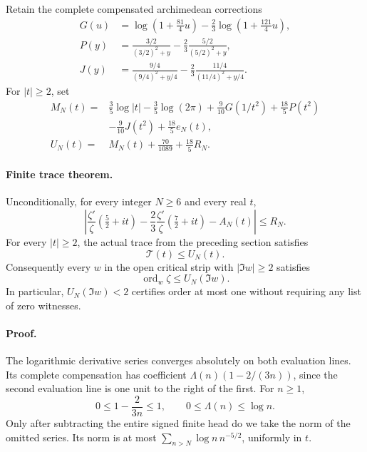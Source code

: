 Retain the complete compensated archimedean corrections
\[
 \begin{aligned}
 G(u)&=\log(1+\tfrac{81}{4}u)
       -\tfrac23\log(1+\tfrac{121}{4}u),\\
 P(y)&=\frac{3/2}{(3/2)^2+y}
       -\frac23\frac{5/2}{(5/2)^2+y},\\
 J(y)&=\frac{9/4}{(9/4)^2+y/4}
       -\frac23\frac{11/4}{(11/4)^2+y/4}.
 \end{aligned}
\]
For \(|t|\ge2\), set
\[
 \begin{aligned}
 M_N(t)={}&\frac35\log|t|-\frac35\log(2\pi)
  +\frac9{10}G(1/t^2)+\frac{18}{5}P(t^2)\\
 &-\frac9{10}J(t^2)+\frac{18}{5}e_N(t),\\
 U_N(t)={}&M_N(t)+\frac{70}{1089}+\frac{18}{5}R_N.
 \end{aligned}
\]

\paragraph{Finite trace theorem.}
Unconditionally, for every integer \(N\ge6\) and every real \(t\),
\begin{equation}
 \left|\frac{\zeta'}{\zeta}(\tfrac52+it)
       -\frac23\frac{\zeta'}{\zeta}(\tfrac72+it)-A_N(t)\right|
 \le R_N.
 \label{eq:finite-euler-error}
\end{equation}
For every \(|t|\ge2\), the actual trace from the preceding section satisfies
\begin{equation}
 \mathcal T(t)\le U_N(t).
 \label{eq:finite-euler-trace}
\end{equation}
Consequently every \(w\) in the open critical strip with \(|\Im w|\ge2\)
satisfies
\[
 \operatorname{ord}_w\zeta\le U_N(\Im w).
\]
In particular, \(U_N(\Im w)<2\) certifies order at most one without requiring
any list of zero witnesses.

\paragraph{Proof.}
The logarithmic derivative series converges absolutely on both evaluation
lines.  Its complete compensation has coefficient
\(\Lambda(n)(1-2/(3n))\), since the second evaluation line is one unit to
the right of the first.  For \(n\ge1\),
\[
 0\le1-\frac{2}{3n}\le1,\qquad 0\le\Lambda(n)\le\log n.
\]
Only after subtracting the entire signed finite head do we take the norm
of the omitted series.  Its norm is at most
\(\sum_{n>N}\log n\,n^{-5/2}\), uniformly in \(t\).


